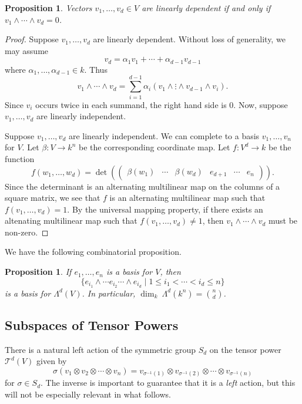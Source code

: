 \documentclass[12pt]{article}
\theoremstyle{plain}
\newtheorem{proposition}[theorem]{Proposition}
\theoremstyle{definition}
\theoremstyle{remark}
\numberwithin{equation}{section}
\begin{document}
\begin{proposition}
Vectors $v_1,\ldots , v_d \in V$ are linearly dependent
if and only if $v_1 \wedge \cdots \wedge v_d=0$.
\end{proposition}

\begin{proof}
Suppose $v_1,\ldots, v_d$ are linearly dependent.
Without loss of generality, we may assume
\[
v_d = \alpha_1 v_1 + \cdots + \alpha_{d-1} v_{d-1}
\]
where $\alpha_1, \ldots, \alpha_{d-1} \in k$.
Thus
\[
v_1 \wedge \cdots \wedge v_d =
\sum_{i=1}^{d-1} \alpha_i(v_1 \wedge \vdots \wedge v_{d-1} \wedge v_i).
\]
Since $v_i$ occurs twice in each summand, the right hand side is $0$.
Now, suppose $v_1,\ldots,v_d$ are linearly independent.

Suppose $v_1,\ldots, v_d$ are linearly independent.
We can complete to a basis $v_1,\ldots,v_n$ for $V$.
Let $\beta : V \to k^n$ be the corresponding coordinate map.
Let $f : V^d \to k$ be the function
\[
f(w_1,\ldots,w_d) = \det\left(
\begin{pmatrix} \beta(w_1) & \cdots & \beta(w_d)
& e_{d+1} & \cdots & e_n
\end{pmatrix}
\right) .
\]
Since the determinant is an alternating multilinear map on the columns
of a square matrix, we see that $f$ is an alternating multilinear map
such that $f(v_1,\ldots,v_d)=1$.
By the universal mapping property, if there exists an altenating
multilinear map such that $f(v_1,\ldots,v_d) \ne 1$,
then $v_1 \wedge \cdots \wedge v_d$ must be non-zero.
\end{proof}

We have the following combinatorial proposition.

\begin{proposition}
If $e_1, \ldots, e_n$ is a basis for $V$, then
\[
\{
e_{i_1} \wedge \cdots e_{i_2} \cdots \wedge e_{i_d}
\mid
1 \le i_1 < \cdots < i_d \le n
\}
\]
is a basis for $\Lambda^d(V)$.
In particular, $\dim_k\ \Lambda^d(k^n)=\binom{n}{d}$.
\end{proposition}

\subsection{Subspaces of Tensor Powers}

There is a natural left action of the symmetric group $S_d$ on the
tensor power $\mathcal{T}^d(V)$ given by
\[
\sigma(v_1 \otimes v_2 \otimes \cdots \otimes v_n)
= v_{\sigma^{-1}(1)} \otimes v_{\sigma^{-1}(2)} \otimes \cdots
\otimes v_{\sigma^{-1}(n)}
\]
for $\sigma \in S_d$.
The inverse is important to guarantee that it is a \emph{left} action,
but this will not be especially relevant in what follows.
\end{document}
